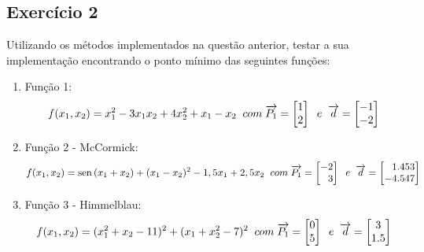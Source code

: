\documentclass[10pt, a4paper]{article}
\DeclareMathOperator{\sen}{sen}
\begin{document}
\subsection{Exercício 2}

Utilizando os métodos implementados na questão anterior, testar a sua implementação encontrando o ponto mínimo
das seguintes funções:

\begin{enumerate}
  \item Função 1: 
  \begin{equation*}
    f(x_1, x_2) = x_1^2 - 3x_1x_2 + 4x_2^2 + x_1 - x_2 \;\; com \;\; \\
    \overrightarrow{P_1} = 
    \begin{bmatrix}
     1 \\ 2
    \end{bmatrix} \;\; e \;\; \overrightarrow{d} =
    \begin{bmatrix}
    -1 \\ -2
    \end{bmatrix}
 \end{equation*}

 \item Função 2 - McCormick:
 \begin{equation*}
  f(x_1, x_2) = \sen{(x_1 + x_2)} + (x_1 - x_2)^2 - 1,5x_1 + 2,5x_2 \;\; com \;\; \\
  \overrightarrow{P_1} = 
  \begin{bmatrix}
   -2 \\ \phantom{-}3
  \end{bmatrix} \;\; e \;\; \overrightarrow{d} =
  \begin{bmatrix}
  \phantom{-}1.453 \\ -4.547
  \end{bmatrix}
\end{equation*}

\item Função 3 - Himmelblau:
 \begin{equation*}
  f(x_1, x_2) = (x_1^2 + x_2 - 11)^2 + (x_1 + x_2^2 - 7)^2 \;\; com \;\; \\
  \overrightarrow{P_1} = 
  \begin{bmatrix}
   0 \\ 5
  \end{bmatrix} \;\; e \;\; \overrightarrow{d} =
  \begin{bmatrix}
  3 \\ 1.5
  \end{bmatrix}
\end{equation*}

\end{enumerate}
\end{document}
